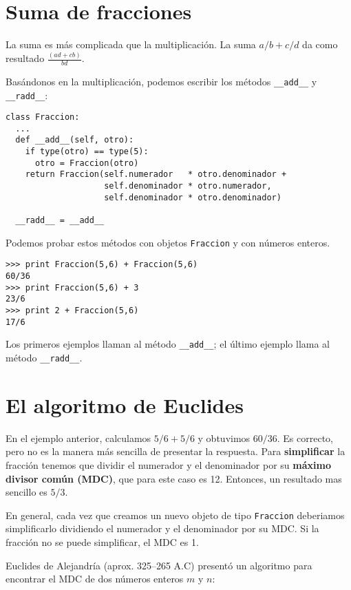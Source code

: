 \section{Suma de fracciones}

La suma es más complicada que la multiplicación. La suma 
$a/b + c/d$ da como resultado $\frac{(ad+cb)}{bd}$.

Basándonos en la multiplicación, podemos escribir los métodos
\texttt{\_\_add\_\_} y \texttt{\_\_radd\_\_}:

\beforeverb
\begin{verbatim}
class Fraccion:
  ...
  def __add__(self, otro):
    if type(otro) == type(5):
      otro = Fraccion(otro)
    return Fraccion(self.numerador   * otro.denominador +
                    self.denominador * otro.numerador,
                    self.denominador * otro.denominador)

  __radd__ = __add__
\end{verbatim}
\afterverb
%
Podemos probar estos métodos con objetos  \texttt{Fraccion} y 
con números enteros.

\beforeverb
\begin{verbatim}
>>> print Fraccion(5,6) + Fraccion(5,6)
60/36
>>> print Fraccion(5,6) + 3
23/6
>>> print 2 + Fraccion(5,6)
17/6
\end{verbatim}
\afterverb
%
Los primeros ejemplos llaman al método \texttt{\_\_add\_\_}; el 
último ejemplo llama al método \texttt{\_\_radd\_\_}.


\section{El algoritmo de Euclides}

En el ejemplo anterior, calculamos $5/6 + 5/6$ y obtuvimos
$60/36$.  Es correcto, pero no es la manera más sencilla de 
presentar la respuesta. Para {\bf simplificar} la fracción tenemos
que dividir el numerador y el denominador por su  {\bf máximo 
divisor común (MDC)}, que para este caso es 12.  Entonces, un
 resultado mas sencillo es $5/3$.

En general, cada vez que creamos un nuevo objeto de tipo \texttt{Fraccion} deberiamos simplificarlo dividiendo el 
numerador y el denominador por su MDC. Si la fracción no se puede
simplificar, el MDC es 1.

Euclides de Alejandría (aprox. 325--265 A.C) presentó un algoritmo
para encontrar el MDC de dos números enteros $m$ y $n$:

